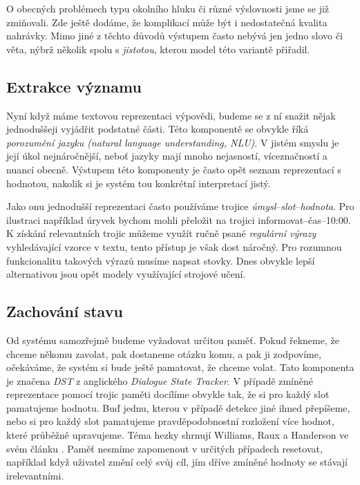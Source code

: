 O obecných problémech typu okolního hluku či různé výslovnosti jsme se
již zmiňovali. Zde ještě dodáme, že komplikací může být i nedostatečná kvalita
nahrávky. Mimo jiné z těchto důvodů výstupem často nebývá jen jedno
slovo či věta, nýbrž několik spolu s \textit{jistotou}, kterou model této
variantě přiřadil.

\subsection{Extrakce významu}

Nyní když máme textovou reprezentaci výpovědi, budeme se z ní snažit nějak
jednoduššeji vyjádřit podstatné části. Této komponentě se obvykle říká
\textit{porozumění jazyku (natural language understanding, NLU)}. V jistém
smyslu je její úkol nejnáročnější, neboť jazyky mají mnoho nejasností,
víceznačností a nuancí obecně. Výstupem této komponenty je často opět
seznam reprezentací s hodnotou, nakolik si je systém tou konkrétní
interpretací jistý.

Jako onu jednodušší reprezentaci často používáme trojice
\textit{úmysl}--\textit{slot}--\textit{hodnota}. Pro ilustraci například
úryvek  bychom mohli přeložit na trojici
informovat--čas--10:00. K získání relevantních trojic můžeme využít ručně
psané \textit{regulární výrazy} vyhledávající vzorce v textu, tento přístup
je však dost náročný. Pro rozumnou funkcionalitu takových výrazů musíme napsat
stovky. Dnes obvykle lepší alternativou jsou opět modely využívající strojové
učení.

\subsection{Zachování stavu}

Od systému samozřejmě budeme vyžadovat určitou paměť. Pokud řekneme, že
chceme někomu zavolat, pak dostaneme otázku komu, a pak ji zodpovíme, očekáváme,
že systém si bude ještě pamatovat, že chceme volat. Tato komponenta je
značena \textit{DST} z anglického \textit{Dialogue State Tracker}. V případě
zmíněné reprezentace pomocí trojic paměti docílíme obvykle tak, že si pro každý
slot pamatujeme hodnotu. Buď jednu, kterou v případě detekce jiné ihned přepíšeme,
nebo si pro každý slot pamatujeme pravděpodobnostní rozložení více hodnot, které
průběžně upravujeme. Téma hezky shrnují Williams, Raux a Handerson ve svém článku
\citep{williams_dialog_2016}. Paměť nesmíme zapomenout v určitých případech
resetovat, například když uživatel změní celý svůj cíl, jím dříve
zmíněné hodnoty se stávají irelevantními.

